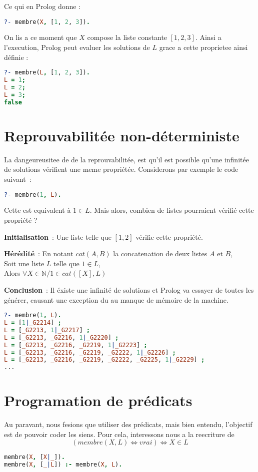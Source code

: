  Ce qui en Prolog donne :
\begin{lstlisting}[language=Prolog]
?- membre(X, [1, 2, 3]).
\end{lstlisting}

On lis a ce moment que $X$ compose la liste constante $[1, 2, 3]$. Ainsi a
l'execution, Prolog peut evaluer les solutions de $L$ grace a cette proprietee
ainsi définie :

\begin{lstlisting}[language=Prolog]
?- membre(L, [1, 2, 3]).
L = 1;
L = 2;
L = 3;
false
\end{lstlisting}


\section{Reprouvabilitée non-déterministe}

La dangeureusitee de de la reprouvabilitée, est qu'il est possible qu'une
infinitée de solutions vérifient une meme propriétée. Considerons par exemple
le code suivant~:

\begin{lstlisting}[language=Prolog]
?- membre(1, L).
\end{lstlisting}

Cette est equivalent à $1 \in L$. Mais alors, combien de listes
pourraient vérifié cette propriété ?

\textbf{Initialisation}~: Une liste telle que $[1, 2]$ vérifie cette propriété.

\textbf{Hérédité}~: En notant $cat(A, B)$ la concatenation de deux listes $A$ et
$B$,\\
Soit une liste $L$ telle que $1 \in L$,\\
Alors $\forall X \in \mathbb{N} / 1 \in cat([X], L)$

\textbf{Conclusion}~: Il éxiste une infinité de solutions et Prolog va essayer
de toutes les générer, causant une exception du au manque de mémoire de la
machine.

\begin{lstlisting}[language=Prolog]
?- membre(1, L).
L = [1|_G2214] ;
L = [_G2213, 1|_G2217] ;
L = [_G2213, _G2216, 1|_G2220] ;
L = [_G2213, _G2216, _G2219, 1|_G2223] ;
L = [_G2213, _G2216, _G2219, _G2222, 1|_G2226] ;
L = [_G2213, _G2216, _G2219, _G2222, _G2225, 1|_G2229] ;
...
\end{lstlisting}


\section{Programation de prédicats}

Au paravant, nous fesions que utiliser des prédicats, mais bien entendu,
l'objectif est de pouvoir coder les siens. Pour cela, interessons nous a la
reecriture de
\[(membre(X, L) \Leftrightarrow vrai) \Leftrightarrow X \in L\]

\begin{lstlisting}[language=Prolog]
membre(X, [X|_]).
membre(X, [_|L]) :- membre(X, L).
\end{lstlisting}
